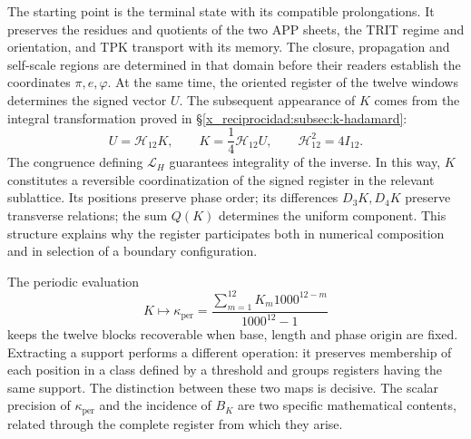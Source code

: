 The starting point is the terminal state with its compatible
prolongations. It preserves the residues and quotients of the two APP
sheets, the TRIT regime and orientation, and TPK transport with its memory.
The closure, propagation and self-scale regions are determined in that
domain before their readers establish the coordinates
$\pi,e,\varphi$. At the same time, the oriented register of the twelve
windows determines the signed vector $U$. The subsequent appearance of $K$
comes from the integral transformation proved in
\S\ref{x_reciprocidad:subsec:k-hadamard}:
\begin{equation}
 U=\mathcal H_{12}K,\qquad
 K=\frac14\mathcal H_{12}U,\qquad
 \mathcal H_{12}^{2}=4I_{12}.
 \label{x_reciprocidad:inc-ampl-registro}
\end{equation}
The congruence defining $\mathcal L_H$ guarantees integrality of
the inverse. In this way, $K$ constitutes a reversible coordinatization
of the signed register in the relevant sublattice. Its positions preserve
phase order; its differences $D_3K,D_4K$ preserve transverse
relations; the sum $Q(K)$ determines the uniform component. This
structure explains why the register participates both in numerical
composition and in selection of a boundary configuration.

The periodic evaluation
\[
 K\longmapsto\kappa_{\mathrm{per}}
 =\frac{\sum_{m=1}^{12}K_m1000^{12-m}}{1000^{12}-1}
\]
keeps the twelve blocks recoverable when base, length and phase
origin are fixed. Extracting a support performs a different
operation: it preserves membership of each position in a class defined
by a threshold and groups registers having the same support. The
distinction between these two maps is decisive. The scalar
precision of $\kappa_{\mathrm{per}}$ and the incidence of $B_K$ are two
specific mathematical contents, related through the complete
register from which they arise.




